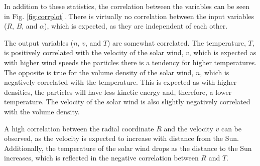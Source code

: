 In addition to these statistics, the correlation between the variables can be seen in Fig. \ref{fig:corrplot}. There is virtually no correlation between the input variables ($R$, $B$, and $\alpha$), which is expected, as they are independent of each other. 

The output variables ($n$, $v$, and $T$) are somewhat correlated. The temperature, $T$, is positively correlated with the velocity of the solar wind, $v$, which is expected as with higher wind speeds the particles there is a tendency for higher temperatures. The opposite is true for the volume density of the solar wind, $n$, which is negatively correlated with the temperature. This is expected as with higher densities, the particles will have less kinetic energy and, therefore, a lower temperature. The velocity of the solar wind is also slightly negatively correlated with the volume density.

A high correlation between the radial coordinate $R$ and the velocity $v$ can be observed, as the velocity is expected to increase with distance from the Sun. Additionally, the temperature of the solar wind drops as the distance to the Sun increases, which is reflected in the negative correlation between $R$ and $T$.

